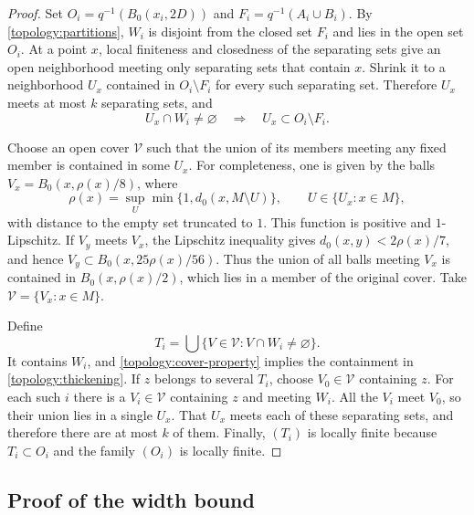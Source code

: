 \begin{proof}
Set $O_i=q^{-1}(B_0(x_i,2D))$ and
$F_i=q^{-1}(A_i\cup B_i)$.  By
\cref{topology:partitions}, $W_i$ is disjoint from the closed set $F_i$
and lies in the open set $O_i$.  At a point $x$, local finiteness and
closedness of the separating sets give an open neighborhood meeting only separating sets
that contain $x$.  Shrink it to a neighborhood $U_x$ contained in
$O_i\setminus F_i$ for every such separating set.  Therefore $U_x$ meets at most
$k$ separating sets, and
\begin{equation}\label{topology:cover-property}
 U_x\cap W_i\ne\varnothing\quad\Longrightarrow\quad
 U_x\subset O_i\setminus F_i.
\end{equation}

Choose an open cover $\mathcal V$ such that the union
of its members meeting any fixed member is contained in some $U_x$.
For completeness, one is given by the balls
$V_x=B_0(x,\rho(x)/8)$, where
\[
 \rho(x)=\sup_U\min\{1,d_0(x,M\setminus U)\},
 \qquad U\in\{U_x:x\in M\},
\]
with distance to the empty set truncated to $1$. This function is
positive and $1$-Lipschitz. If $V_y$ meets $V_x$, the Lipschitz
inequality gives $d_0(x,y)<2\rho(x)/7$, and hence
$V_y\subset B_0(x,25\rho(x)/56)$. Thus the union of all balls meeting
$V_x$ is contained in $B_0(x,\rho(x)/2)$, which lies in a member of
the original cover. Take $\mathcal V=\{V_x:x\in M\}$.

Define
\[
 T_i=\bigcup\{V\in\mathcal V:V\cap W_i\ne\varnothing\}.
\]
It contains $W_i$, and \eqref{topology:cover-property} implies the
containment in \eqref{topology:thickening}.  If $z$ belongs to several
$T_i$, choose $V_0\in\mathcal V$ containing $z$.  For each such $i$
there is a $V_i\in\mathcal V$ containing $z$ and meeting $W_i$.
All the $V_i$ meet $V_0$, so their union lies in a single $U_x$.
That $U_x$ meets each of these separating sets, and therefore there are at most
$k$ of them.  Finally, $(T_i)$ is locally finite because $T_i\subset O_i$
and the family $(O_i)$ is locally finite.
\end{proof}

\subsection{Proof of the width bound}

